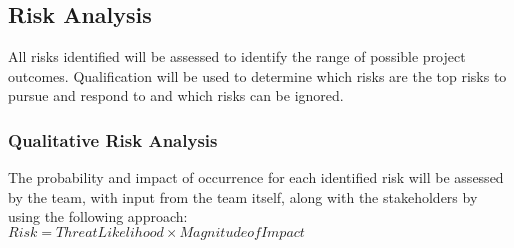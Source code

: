\documentclass{article}
\begin{document}
\subsection{Risk Analysis}
All risks identified will be assessed to identify the range of possible project outcomes.  Qualification will be used to determine which risks are the top risks to pursue and respond to and which risks can be ignored.

\subsubsection{Qualitative Risk Analysis}
The probability and impact of occurrence for each identified risk will be assessed by the team, with input from the team itself, along with the stakeholders by using the following approach:\\
$Risk = Threat Likelihood \times Magnitude of Impact$
\end{document}
